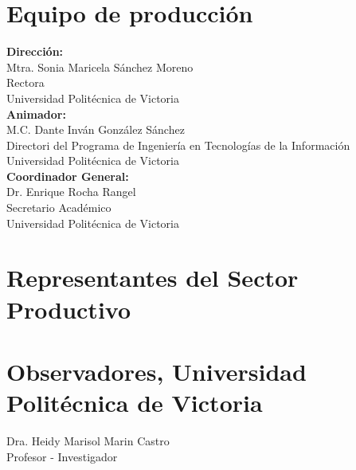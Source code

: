 \documentclass[11pt,letterpaper,twoside]{report}
\begin{document}
	
	\tableofcontents
	\pagebreak
	
	
	\section*{Equipo de producción}
	
	\textbf{Dirección:}\\
	Mtra. Sonia Maricela Sánchez Moreno\\
	Rectora\\
	Universidad Politécnica de Victoria	\\[0.3 cm]
	
	\textbf{Animador:}\\
	M.C. Dante Inván González Sánchez\\
	Directori del Programa de Ingeniería en Tecnologías de la Información\\
	Universidad Politécnica de Victoria \\[0.3 cm]
	
	\textbf{Coordinador General:}\\
	Dr. Enrique Rocha Rangel\\
	Secretario Académico\\
	Universidad Politécnica de Victoria\\[0.3 cm]
	
	\section*{Representantes del Sector Productivo}
	
	
	\pagebreak
	
	\section*{Observadores, Universidad Politécnica de Victoria}
	
	  Dra. Heidy Marisol Marin Castro\\
	  Profesor - Investigador\\[0.3 cm]
	  
\end{document}

